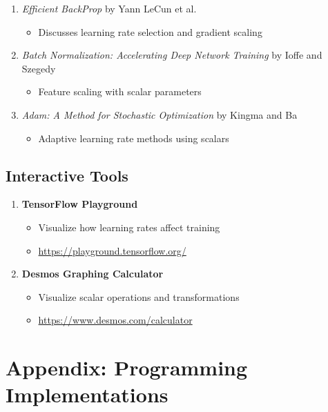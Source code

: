 \documentclass[11pt,a4paper]{article}
\begin{document}
\begin{enumerate}
    \item \textit{Efficient BackProp} by Yann LeCun et al.
    \begin{itemize}
        \item Discusses learning rate selection and gradient scaling
    \end{itemize}
    
    \item \textit{Batch Normalization: Accelerating Deep Network Training} by Ioffe and Szegedy
    \begin{itemize}
        \item Feature scaling with scalar parameters
    \end{itemize}
    
    \item \textit{Adam: A Method for Stochastic Optimization} by Kingma and Ba
    \begin{itemize}
        \item Adaptive learning rate methods using scalars
    \end{itemize}
\end{enumerate}

\subsection{Interactive Tools}

\begin{enumerate}
    \item \textbf{TensorFlow Playground}
    \begin{itemize}
        \item Visualize how learning rates affect training
        \item \url{https://playground.tensorflow.org/}
    \end{itemize}
    
    \item \textbf{Desmos Graphing Calculator}
    \begin{itemize}
        \item Visualize scalar operations and transformations
        \item \url{https://www.desmos.com/calculator}
    \end{itemize}
\end{enumerate}

\section{Appendix: Programming Implementations}
\end{document}
